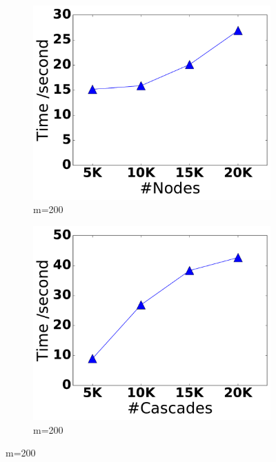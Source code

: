 \begin{figure}[t]
\centering

\begin{subfigure}{.45\textwidth}
\centering
\includegraphics[width=.99\linewidth]{img/chap3/node_number_time.pdf}
\caption{m=200}\label{fig:node_number_time}
\end{subfigure} 
\begin{subfigure}{.45\textwidth}
\centering
\includegraphics[width=.99\linewidth]{img/chap3/cas_number_time.pdf}
\caption{m=200}\label{fig:cas_number_time}
\end{subfigure} %
\hfill


\end{figure}
